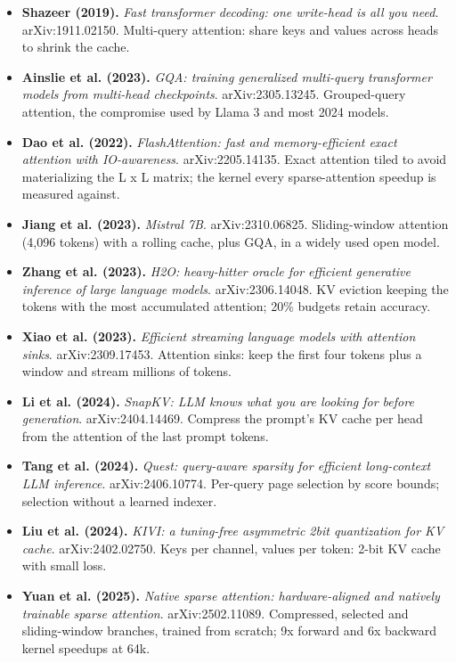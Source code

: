 \documentclass[11pt,letterpaper]{article}
\begin{document}
\begin{itemize}[leftmargin=1.2em,itemsep=3pt]
\item \textbf{Shazeer (2019).} \textit{Fast transformer decoding: one write-head is all you need}. arXiv:1911.02150. Multi-query attention: share keys and values across heads to shrink the cache.
\item \textbf{Ainslie et al. (2023).} \textit{GQA: training generalized multi-query transformer models from multi-head checkpoints}. arXiv:2305.13245. Grouped-query attention, the compromise used by Llama 3 and most 2024 models.
\item \textbf{Dao et al. (2022).} \textit{FlashAttention: fast and memory-efficient exact attention with IO-awareness}. arXiv:2205.14135. Exact attention tiled to avoid materializing the L x L matrix; the kernel every sparse-attention speedup is measured against.
\item \textbf{Jiang et al. (2023).} \textit{Mistral 7B}. arXiv:2310.06825. Sliding-window attention (4,096 tokens) with a rolling cache, plus GQA, in a widely used open model.
\item \textbf{Zhang et al. (2023).} \textit{H2O: heavy-hitter oracle for efficient generative inference of large language models}. arXiv:2306.14048. KV eviction keeping the tokens with the most accumulated attention; 20\% budgets retain accuracy.
\item \textbf{Xiao et al. (2023).} \textit{Efficient streaming language models with attention sinks}. arXiv:2309.17453. Attention sinks: keep the first four tokens plus a window and stream millions of tokens.
\item \textbf{Li et al. (2024).} \textit{SnapKV: LLM knows what you are looking for before generation}. arXiv:2404.14469. Compress the prompt's KV cache per head from the attention of the last prompt tokens.
\item \textbf{Tang et al. (2024).} \textit{Quest: query-aware sparsity for efficient long-context LLM inference}. arXiv:2406.10774. Per-query page selection by score bounds; selection without a learned indexer.
\item \textbf{Liu et al. (2024).} \textit{KIVI: a tuning-free asymmetric 2bit quantization for KV cache}. arXiv:2402.02750. Keys per channel, values per token: 2-bit KV cache with small loss.
\item \textbf{Yuan et al. (2025).} \textit{Native sparse attention: hardware-aligned and natively trainable sparse attention}. arXiv:2502.11089. Compressed, selected and sliding-window branches, trained from scratch; 9x forward and 6x backward kernel speedups at 64k.

\end{itemize}
\end{document}
